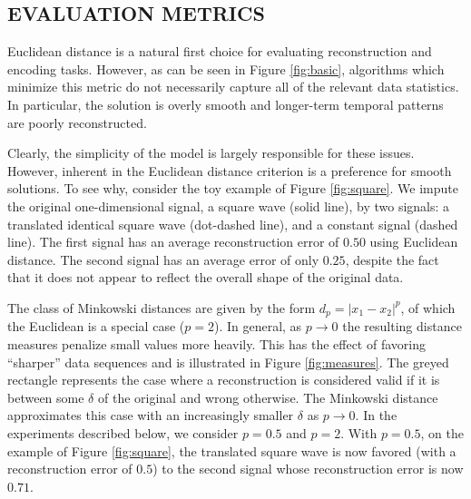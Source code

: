 \documentclass{article}
\newcommand{\FIXME}[2][FIXME]{\textcolor{blue}{\textbf{#1}: \emph{#2}}}
\begin{document}
\subsection{EVALUATION METRICS}
\label{ssec:measures}
Euclidean distance is a natural first choice for evaluating
reconstruction and encoding tasks. However, as can be seen in Figure
\ref{fig:basic}, algorithms which minimize this metric do not
necessarily capture all of the relevant data statistics.  In
particular, the solution is overly smooth and longer-term temporal
patterns are poorly reconstructed.

Clearly, the simplicity of the model is largely responsible for these
issues.  However, inherent in the Euclidean distance criterion is a
preference for smooth solutions.
To see why, consider the toy example of Figure \ref{fig:square}. We
impute the original one-dimensional signal, a square wave (solid
line), by two signals: a translated identical square wave (dot-dashed
line), and a constant signal (dashed line). The first signal has an
average reconstruction error of $0.50$ using Euclidean distance. The
second signal has an average error of only $0.25$, despite the fact
that it does not appear to reflect the overall shape of the original
data.


The class of Minkowski distances are given by the form $d_p =
|x_1-x_2|^p$, of which the Euclidean is a special case ($p=2$).  In
general, as $p \rightarrow 0$ the resulting distance measures penalize
small values more heavily.  This has the effect of favoring
``sharper'' data sequences and is illustrated in Figure
\ref{fig:measures}.  The greyed rectangle represents the case where a
reconstruction is considered valid if it is between some $\delta$ of
the original and wrong otherwise.  The Minkowski distance approximates
this case with an increasingly smaller $\delta$ as $p \rightarrow 0$.
In the experiments described below, we consider $p=0.5$ and $p=2$.
With $p=0.5$, on the example of Figure \ref{fig:square}, the
translated square wave is now favored (with a reconstruction error of
$0.5$) to the second signal whose reconstruction error is now $0.71$.
\end{document}
